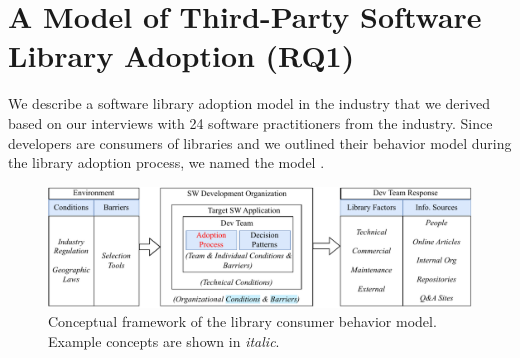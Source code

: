 \section{A Model of Third-Party Software Library Adoption (RQ1)}
We describe a software library adoption model in the industry that we derived based on our interviews with 24 software practitioners from the industry. Since developers are consumers of libraries and we outlined their behavior model during the library adoption process, we named the model \model.











\begin{figure}
    \centering
    \includegraphics[scale=0.8  ]{images/Library-adoption-framework.v4.pdf}
    \caption{Conceptual framework of the library consumer behavior model. Example concepts are shown in \textit{italic}.}
    \label{fig:framework}
\end{figure}

